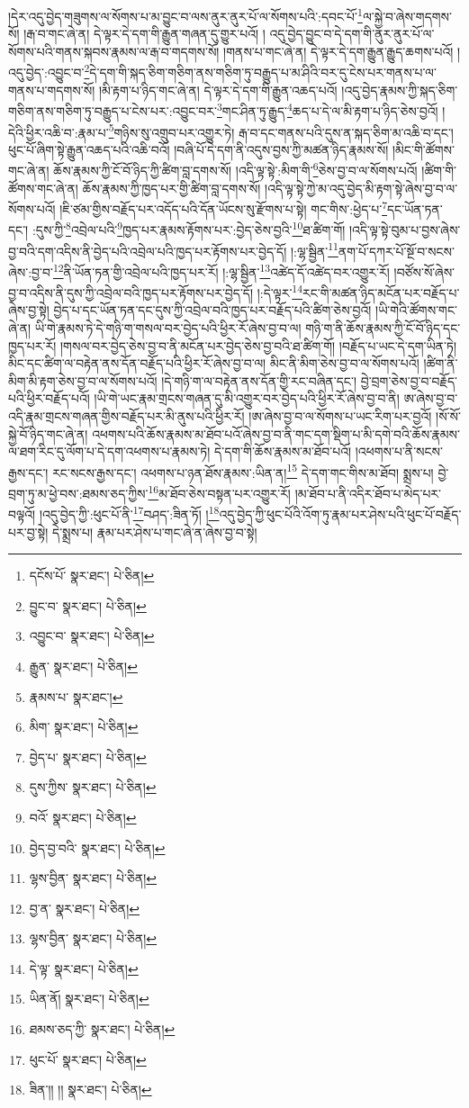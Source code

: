 །དེར་འདུ་བྱེད་གཟུགས་ལ་སོགས་པ་མ་བྱུང་བ་ལས་ནུར་ནུར་པོ་ལ་སོགས་པའི་:དབང་པོ་\footnote{དངོས་པོ་  སྣར་ཐང་།  པེ་ཅིན། }ལ་སྐྱེ་བ་ཞེས་གདགས་སོ། །རྒ་བ་གང་ཞེ་ན། དེ་ལྟར་དེ་དག་གི་རྒྱུན་གཞན་དུ་གྱུར་པའོ། །
འདུ་བྱེད་བྱུང་བ་དེ་དག་གི་ནུར་ནུར་པོ་ལ་སོགས་པའི་གནས་སྐབས་རྣམས་ལ་རྒ་བ་གདགས་སོ། །གནས་པ་གང་ཞེ་ན། དེ་ལྟར་དེ་དག་རྒྱུན་རྒྱུད་ཆགས་པའོ། །འདུ་བྱེད་:འབྱུང་བ་\footnote{བྱུང་བ་  སྣར་ཐང་།  པེ་ཅིན། }དེ་དག་གི་སྐད་ཅིག་གཅིག་ནས་གཅིག་ཏུ་བརྒྱུད་པ་མ་ཤིའི་བར་དུ་ངེས་པར་གནས་པ་ལ་གནས་པ་གདགས་སོ། །མི་རྟག་པ་ཉིད་གང་ཞེ་ན། དེ་ལྟར་དེ་དག་གི་རྒྱུན་འཆད་པའོ། །འདུ་བྱེད་རྣམས་ཀྱི་སྐད་ཅིག་གཅིག་ནས་གཅིག་ཏུ་བརྒྱུད་པ་ངེས་པར་:འབྱུང་བར་\footnote{འབྱུང་བ་  སྣར་ཐང་།  པེ་ཅིན། }གང་ཤིན་ཏུ་རྒྱུད་\footnote{རྒྱུན་  སྣར་ཐང་།  པེ་ཅིན། }ཆད་པ་དེ་ལ་མི་རྟག་པ་ཉིད་ཅེས་བྱའོ། །དེའི་ཕྱིར་འཆི་བ་:རྣམ་པ་\footnote{རྣམས་པ་  སྣར་ཐང་། }གཉིས་སུ་འགྲུབ་པར་འགྱུར་ཏེ། རྒ་བ་དང་གནས་པའི་དུས་ན་སྐད་ཅིག་མ་འཆི་བ་དང་། ཕུང་པོ་ཞིག་སྟེ་རྒྱུན་འཆད་པའི་འཆི་བའོ། །བཞི་པོ་དེ་དག་ནི་འདུས་བྱས་ཀྱི་མཚན་ཉིད་རྣམས་སོ། །མིང་གི་ཚོགས་གང་ཞེ་ན། ཆོས་རྣམས་ཀྱི་ངོ་བོ་ཉིད་ཀྱི་ཚིག་བླ་དགས་སོ། །འདི་ལྟ་སྟེ་:མིག་གི་\footnote{མིག་  སྣར་ཐང་།  པེ་ཅིན། }ཅེས་བྱ་བ་ལ་སོགས་པའོ། །ཚིག་གི་ཚོགས་གང་ཞེ་ན། ཆོས་རྣམས་ཀྱི་ཁྱད་པར་གྱི་ཚིག་བླ་དགས་སོ། །འདི་ལྟ་སྟེ་ཀྱེ་མ་འདུ་བྱེད་མི་རྟག་སྟེ་ཞེས་བྱ་བ་ལ་སོགས་པའོ། །ཇི་ཙམ་གྱིས་བརྗོད་པར་འདོད་པའི་དོན་ཡོངས་སུ་རྫོགས་པ་སྟེ། གང་གིས་:ཕྱེད་པ་\footnote{བྱེད་པ་  སྣར་ཐང་།  པེ་ཅིན། }དང་ཡོན་ཏན་དང་། :དུས་ཀྱི་\footnote{དུས་ཀྱིས་  སྣར་ཐང་།  པེ་ཅིན། }འབྲེལ་པའི་\footnote{བའོ་  སྣར་ཐང་།  པེ་ཅིན། }ཁྱད་པར་རྣམས་རྟོགས་པར་:བྱེད་ཅེས་བྱའི་\footnote{བྱེད་བྱ་བའི་  སྣར་ཐང་།  པེ་ཅིན། }ཐ་ཚིག་གོ། །འདི་ལྟ་སྟེ་བུམ་པ་བྱས་ཞེས་བྱ་བའི་དག་འདིས་ནི་བྱེད་པའི་འབྲེལ་པའི་ཁྱད་པར་རྟོགས་པར་བྱེད་དོ། །:ལྷ་སྦྱིན་\footnote{ལྷས་བྱིན་  སྣར་ཐང་།  པེ་ཅིན། }ནག་པོ་དཀར་པོ་སྔོ་བ་སངས་ཞེས་:བྱ་བ་\footnote{བྱ་ན་  སྣར་ཐང་།  པེ་ཅིན། }ནི་ཡོན་ཏན་གྱི་འབྲེལ་པའི་ཁྱད་པར་རོ། །:ལྷ་སྦྱིན་\footnote{ལྷས་བྱིན་  སྣར་ཐང་།  པེ་ཅིན། }འཚེད་དོ་འཚེད་བར་འགྱུར་རོ། །བཙོས་སོ་ཞེས་བྱ་བ་འདིས་ནི་དུས་ཀྱི་འབྲེལ་བའི་ཁྱད་པར་རྟོགས་པར་བྱེད་དོ། །:དེ་ལྟར་\footnote{དེ་ལྟ་  སྣར་ཐང་།  པེ་ཅིན། }རང་གི་མཚན་ཉིད་མངོན་པར་བརྗོད་པ་ཞེས་བྱ་སྟེ། བྱེད་པ་དང་ཡོན་ཏན་དང་དུས་ཀྱི་འབྲེལ་བའི་ཁྱད་པར་བརྗོད་པའི་ཚིག་ཅེས་བྱའོ། །ཡི་གེའི་ཚོགས་གང་ཞེ་ན། ཡི་གེ་རྣམས་ཏེ་དེ་གཉི་ག་གསལ་བར་བྱེད་པའི་ཕྱིར་རོ་ཞེས་བྱ་བ་ལ། གཉི་ག་ནི་ཆོས་རྣམས་ཀྱི་ངོ་བོ་ཉིད་དང་ཁྱད་པར་རོ། །གསལ་བར་བྱེད་ཅེས་བྱ་བ་ནི་མངོན་པར་བྱེད་ཅེས་བྱ་བའི་ཐ་ཚིག་གོ། །བརྗོད་པ་ཡང་དེ་དག་ཡིན་ཏེ། མིང་དང་ཚིག་ལ་བརྟེན་ནས་དོན་བརྗོད་པའི་ཕྱིར་རོ་ཞེས་བྱ་བ་ལ། མིང་ནི་མིག་ཅེས་བྱ་བ་ལ་སོགས་པའོ། །ཚིག་ནི་མིག་མི་རྟག་ཅེས་བྱ་བ་ལ་སོགས་པའོ། །དེ་གཉི་ག་ལ་བརྟེན་ནས་དོན་གྱི་རང་བཞིན་དང་། བྱེ་བྲག་ཅེས་བྱ་བ་བརྗོད་པའི་ཕྱིར་བརྗོད་པའོ། །ཡི་གེ་ཡང་རྣམ་གྲངས་གཞན་དུ་མི་འགྱུར་བར་བྱེད་པའི་ཕྱིར་རོ་ཞེས་བྱ་བ་ནི། ཨ་ཞེས་བྱ་བ་འདི་རྣམ་གྲངས་གཞན་གྱིས་བརྗོད་པར་མི་ནུས་པའི་ཕྱིར་རོ། །ཨ་ཞེས་བྱ་བ་ལ་སོགས་པ་ཡང་རིག་པར་བྱའོ། །སོ་སོ་སྐྱེ་བོ་ཉིད་གང་ཞེ་ན། འཕགས་པའི་ཆོས་རྣམས་མ་ཐོབ་པའོ་ཞེས་བྱ་བ་ནི་གང་དག་སྡིག་པ་མི་དགེ་བའི་ཆོས་རྣམས་ལ་ཐག་རིང་དུ་ལོག་པ་དེ་དག་འཕགས་པ་རྣམས་ཏེ། དེ་དག་གི་ཆོས་རྣམས་མ་ཐོབ་པའོ། །འཕགས་པ་ནི་སངས་རྒྱས་དང་། རང་སངས་རྒྱས་དང་། འཕགས་པ་ཉན་ཐོས་རྣམས་:ཡིན་ན།\footnote{ཡིན་ནོ།  སྣར་ཐང་།  པེ་ཅིན། } དེ་དག་གང་གིས་མ་ཐོབ། སྨྲས་པ། བྱེ་བྲག་ཏུ་མ་ཕྱེ་བས་:ཐམས་ཅད་ཀྱིས་\footnote{ཐམས་ཅད་ཀྱི་  སྣར་ཐང་།  པེ་ཅིན། }མ་ཐོབ་ཅེས་བསྟན་པར་འགྱུར་རོ། །མ་ཐོབ་པ་ནི་འདིར་ཐོབ་པ་མེད་པར་བལྟའོ། །འདུ་བྱེད་ཀྱི་:ཕུང་པོ་ནི་\footnote{ཕུང་པོ་  སྣར་ཐང་།  པེ་ཅིན། }བཤད་:ཟིན་ཏོ། །\footnote{ཟིན་།། །།  སྣར་ཐང་།  པེ་ཅིན། }འདུ་བྱེད་ཀྱི་ཕུང་པོའི་འོག་ཏུ་རྣམ་པར་ཤེས་པའི་ཕུང་པོ་བརྗོད་པར་བྱ་སྟེ། དེ་སྨྲས་པ། རྣམ་པར་ཤེས་པ་གང་ཞེ་ན་ཞེས་བྱ་བ་སྟེ། 